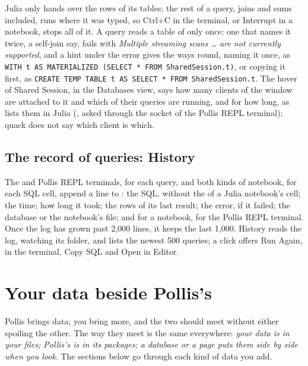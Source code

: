 Julia only hands over the rows of its tables; the rest of a query, joins and sums included, runs where it was typed, so
Ctrl+C in the  terminal, or Interrupt in a notebook, stops all of it. A query reads a table of
 only once: one that names it twice, a self-join say, fails with \emph{Multiple streaming scans
\ldots{} are not currently supported}, and a hint under the error gives the ways round, naming it once, as
\texttt{\small WITH t AS MATERIALIZED (SELECT * FROM SharedSession.t)}, or copying it first, as
\texttt{\small CREATE TEMP TABLE t AS SELECT * FROM SharedSession.t}. The hover of Shared Session, in the Databases
view, says how many clients of the window are attached to it and which of their queries are running, and for how long,
as  lists them in Julia (, asked through the socket of the
Pollis REPL terminal); quack does not say which client is which.

\subsection{The record of queries: History}\label{sec:history}
The  and Pollis REPL terminals, for each query, and both kinds of notebook, for each SQL cell, append a line to
: the SQL, without the  of a Julia notebook's cell; the time;
how long it took; the rows of its last result; the error, if it failed; the database or the notebook's file; and
 for a notebook,  for the Pollis REPL terminal. Once the log has
grown past 2,000 lines, it keeps the last 1,000. History reads the log, watching its folder, and lists the newest 500
queries; a click offers Run Again, in the  terminal, Copy SQL and Open in Editor.

\section{Your data beside Pollis's}\label{sec:yours}

Pollis brings data; you bring more, and the two should meet without either spoiling the other. The way they meet is
the same everywhere: \emph{your data is in your files; Pollis's is in its packages; a database or a page puts them
side by side when you look}. The sections below go through each kind of data you add.

